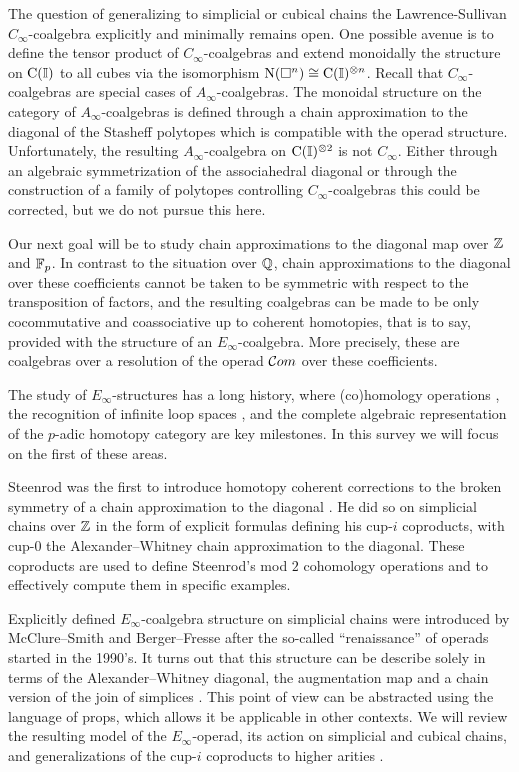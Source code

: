 The question of generalizing to simplicial or cubical chains the Lawrence-Sullivan $C_\infty$-coalgebra explicitly and minimally remains open.
One possible avenue is to define the tensor product of $C_\infty$-coalgebras and extend monoidally the structure on $\operatorname{C}(\mathbb{I})$ to all cubes via the isomorphism $\operatorname{N}(\square^n) \cong \operatorname{C}(\mathbb{I})^{\otimes n}$.
Recall that $C_\infty$-coalgebras are special cases of $A_\infty$-coalgebras.
The monoidal structure on the category of $A_\infty$-coalgebras is defined through a chain approximation to the diagonal of the Stasheff polytopes which is compatible with the operad structure.
Unfortunately, the resulting $A_\infty$-coalgebra on $\operatorname{C}(\mathbb{I})^{\otimes 2}$ is not $C_\infty$.
Either through an algebraic symmetrization of the associahedral diagonal or through the construction of a family of polytopes controlling $C_\infty$-coalgebras this could be corrected, but we do not pursue this here.

Our next goal will be to study chain approximations to the diagonal map over $\mathbb{Z}$ and ${\mathbb{F}_p}$.
In contrast to the situation over $\mathbb{Q}$, chain approximations to the diagonal over these coefficients cannot be taken to be symmetric with respect to the transposition of factors, and the resulting coalgebras can be made to be only cocommutative and coassociative up to coherent homotopies, that is to say, provided with the structure of an $E_\infty$-coalgebra.
More precisely, these are coalgebras over a resolution of the operad $\mathcal{C}om$ over these coefficients.

The study of $E_\infty$-structures has a long history, where (co)homology operations \cite{steenrod1962cohomology, may1970general}, the recognition of infinite loop spaces \cite{boardman1973homotopy, may1972geometry}, and the complete algebraic representation of the $p$-adic homotopy category \cite{mandell2001padic} are key milestones.
In this survey we will focus on the first of these areas.

Steenrod was the first to introduce homotopy coherent corrections to the broken symmetry of a chain approximation to the diagonal \cite{steenrod1947products}.
He did so on simplicial chains over $\mathbb{Z}$ in the form of explicit formulas defining his cup-$i$ coproducts, with \mbox{cup-$0$} the Alexander--Whitney chain approximation to the diagonal.
These coproducts are used to define Steenrod's mod $2$ cohomology operations and to effectively compute them in specific examples.

Explicitly defined $E_\infty$-coalgebra structure on simplicial chains were introduced by McClure--Smith \cite{mcclure2003multivariable} and Berger--Fresse \cite{berger2004combinatorial} after the so-called ``renaissance'' of operads started in the 1990's.
It turns out that this structure can be describe solely in terms of the Alexander--Whitney diagonal, the augmentation map and a chain version of the join of simplices \cite{medina2020prop1}.
This point of view can be abstracted using the language of props, which allows it be applicable in other contexts.
We will review the resulting model of the $E_\infty$-operad, its action on simplicial and cubical chains, and generalizations of the cup-$i$ coproducts to higher arities \cite{medina2020maysteenrod}.